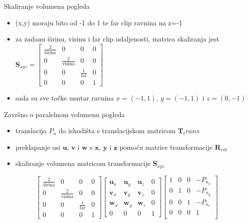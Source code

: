 \documentclass[9pt]{beamer}
\begin{document}
\begin{frame}{Skaliranje volumena pogleda }
	\begin{itemize}
		\item (x,y) moraju bito od -1 do 1 te far clip ravnina na z=-1
		\item za zadanu širinu, visinu i far clip udaljenosti, matrica skaliranja jest
		\\
		$ \mathbf{S}_{xyz} = \left[ \begin{array}{cccc}
		\frac{2}{\textrm{širina}} & 0 & 0 & 0 \\
		0 & \frac{2}{\textrm{visina}} & 0 & 0 \\
		0 & 0 & \frac{1}{\textrm{far}} & 0 \\
		0			   &	0		    &		0		 & 1 \end{array}\right]$
		\item sada su sve točke unutar ravnina $x= (-1,1)$, $y= (-1,1)$ i $z= (0,-1)$
	\end{itemize}
\end{frame}

\begin{frame}{Završno o paralelnom volumenu pogleda }
	\begin{itemize}
		\item translacija $P_{n}$ do ishodišta s translacijskom matricom $\mathbf{T}_trans$
		\item preklapanje osi  $\mathbf{u}$, $\mathbf{v}$ i $\mathbf{w}$ s 
		$\mathbf{x}$, $\mathbf{y}$ i $\mathbf{z}$ pomoću matrice transformacije $\mathbf{R}_{rot}$
		\item skaliranje volumena matricom transformacije $\mathbf{S}_{xyz}$
	\end{itemize}
	\begin{equation}
	\left[ \begin{array}{cccc}
	\frac{2}{\textrm{širina}} & 0 & 0 & 0 \\
	0 & \frac{2}{\textrm{visina}} & 0 & 0 \\
	0 & 0 & \frac{1}{\textrm{far}} & 0 \\
	0			   &	0		    &		0		 & 1 \end{array}\right]
	\left[ \begin{array}{cccc}
	\mathbf{u}_{x} & \mathbf{u}_{y} & \mathbf{u}_{z} & 0 \\
	\mathbf{v}_{x} & \mathbf{v}_{y} & \mathbf{v}_{z} & 0 \\
	\mathbf{w}_{x} & \mathbf{w}_{y} & \mathbf{w}_{z} & 0 \\
	0			   &	0		    &		0		 & 1 \end{array}\right]
	\left[ \begin{array}{cccc}
	1 & 0 & 0 & -P_{n_{x}}\\
	0 & 1 & 0 & -P_{n_{y}} \\
	0 & 0 & 1 & -P_{n_{z}} \\
	0 & 0 & 0 & 1 			\\\end{array}\right]\nonumber
	\end{equation}
\end{frame}
\end{document}
